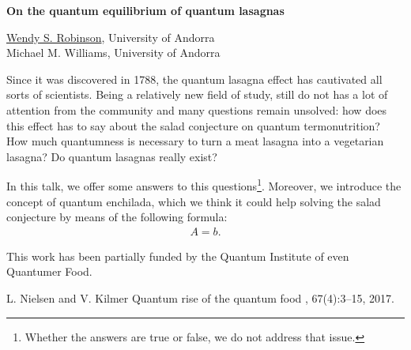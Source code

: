 \documentclass[a4paper, 11pt]{article}
\newcommand{\abstracttitle}[1]{{
    \centering
    \LARGE \textbf{#1}\\
    \vspace*{0.7cm}
}}
\newcommand{\firstauthor}[2]{{
    \centering
    \underline{#1}, \textsf{#2}\\
    \vspace*{0.25cm}
}}
\newcommand{\otherauthor}[2]{{
    \centering
    #1, \textsf{#2}\\
    \vspace*{0.25cm}
}}
\newcommand{\abstracttext}[1]{
    \vspace{0.6cm}
    #1
}
\begin{document}
\abstracttitle{On the quantum equilibrium of quantum lasagnas}

\firstauthor{Wendy S. Robinson}{University of Andorra}
\otherauthor{Michael M. Williams}{University of Andorra}

\abstracttext{
    Since it was discovered in 1788, the quantum lasagna effect has cautivated all sorts of scientists. Being a relatively new field of study, still do not has a lot of attention from the community and many questions remain unsolved: how does this effect has to say about the salad conjecture on quantum termonutrition? How much quantumness is necessary to turn a meat lasagna into a vegetarian lasagna? Do quantum lasagnas really exist?

    In this talk, we offer some answers to this questions\footnote{Whether the answers are true or false, we do not address that issue.}. Moreover, we introduce the concept of quantum enchilada, which we think it could help solving the salad conjecture by means of the following formula:
    \begin{align}
        A = b.
    \end{align}

    This work has been partially funded by the Quantum Institute of even Quantumer Food.
}

\begin{thebibliography}{9}
L. Nielsen and V. Kilmer
\newblock Quantum rise of the quantum food
, 67(4):3--15, 2017.
\end{thebibliography}
\end{document}
